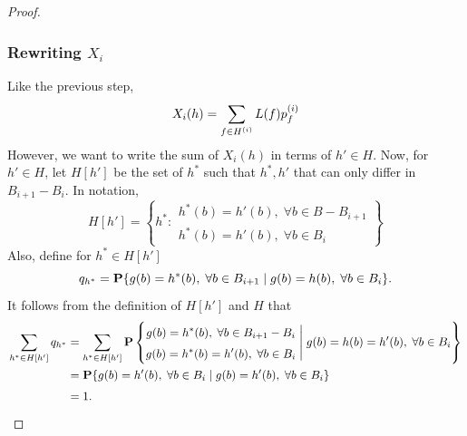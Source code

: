 \begin{proof}
\subsubsection*{Rewriting $X_i$}
Like the previous step,
\[\everymath{\displaystyle}\arraycolsep=1.4pt\def\arraystretch{1.5}
    \begin{array}{rcl}
    X_{i}(h) & = & \sum_{f\in H^{(i)}} L(f) p_{f}^{(i)}
\end{array}\]
However, we want to write the sum of $X_{i}(h)$ in terms of $h' \in H$. Now, for $h' \in H$, let $H[h']$ be the set of $h^*$ such that $h^*, h'$ that can only differ in $B_{i+1}-B_{i}$. In notation,
\[ H[h'] = \left\{ h^*: \begin{matrix}
    h^*(b) = h'(b),\; \forall b\in B-B_{i+1}\\
    h^*(b) = h'(b) ,\; \forall b\in B_{i}
\end{matrix} \right\} \] 
Also, define for $h^* \in H[h']$
\[ q_{h^*} = \P\{g(b) = h^*(b),\; \forall b\in B_{i+1} \;|\; g(b) = h(b),\; \forall b\in B_{i} \}. \]
It follows from the definition of $H[h']$ and $H$ that
\[ \everymath{\displaystyle}\arraycolsep=1.4pt\def\arraystretch{1.5}
    \begin{array}{rcl}
    \sum_{h^* \in H[h']} q_{h^*} & = & \sum_{h^* \in H[h']} \P\left\{\begin{matrix} g(b) = h^*(b),\; \forall b\in B_{i+1}-B_i\\  g(b) = h^*(b) = h'(b) ,\; \forall b\in B_i \end{matrix} \;\Bigg|\; g(b) = h(b) = h'(b),\; \forall b\in B_{i} \right\} \\
     & = & \P\{g(b) = h'(b),\; \forall b\in B_{i} \;|\; g(b) = h'(b),\; \forall b\in B_{i} \}\\
     & = & 1.
\end{array} \]  


\end{proof}
